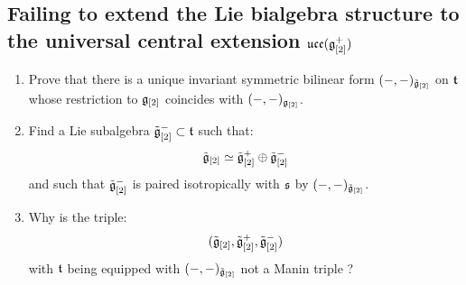         \subsection{Failing to extend the Lie bialgebra structure to the universal central extension \texorpdfstring{$\mathfrak{uce}( \mathfrak{g}_{[2]}^+ )$}{}}
            \begin{question} \label{question: extending_invariant_inner_products_on_multi_loop_to_universal_central_extensions}
                \begin{enumerate}
                    \item Prove that there is a unique invariant symmetric bilinear form $(-, -)_{\tilde{\mathfrak{g}}_{[2]}}$ on $\mathfrak{t}$ whose restriction to $\mathfrak{g}_{[2]}$ coincides with $(-, -)_{\mathfrak{g}_{[2]}}$.
                    \item Find a Lie subalgebra $\tilde{\mathfrak{g}}_{[2]}^- \subset \mathfrak{t}$ such that:
                        $$\tilde{\mathfrak{g}}_{[2]}\simeq \tilde{\mathfrak{g}}_{[2]}^+\oplus \tilde{\mathfrak{g}}_{[2]}^-$$
                    and such that $\tilde{\mathfrak{g}}_{[2]}^-$ is paired isotropically with $\mathfrak{s}$ by $(-, -)_{\tilde{\mathfrak{g}}_{[2]}}$. 
                    \item Why is the triple:
                        $$(\tilde{\mathfrak{g}}_{[2]}, \tilde{\mathfrak{g}}_{[2]}^+, \tilde{\mathfrak{g}}_{[2]}^-)$$
                    with $\mathfrak{t}$ being equipped with $(-, -)_{\tilde{\mathfrak{g}}_{[2]}}$ not a Manin triple ?
                \end{enumerate}
            \end{question}
